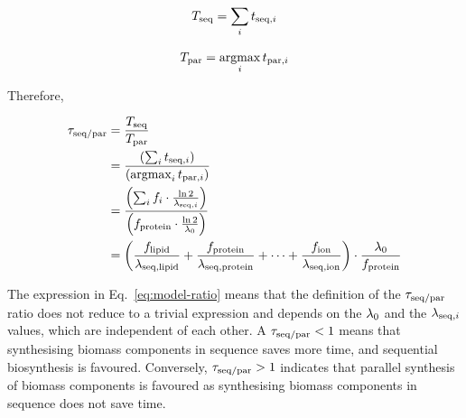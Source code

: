 \begin{equation}
  \Tseq = \sum_{i} \Tiabl %
  \label{eq:model-a}
\end{equation}


\begin{equation}
  T_{\mathrm{par}} = \operatorname*{argmax}_{i} t_{\mathrm{par},i}
  \label{eq:model-b}
\end{equation}


Therefore,

\begin{equation}
  \begin{aligned}
    \tau_{\mathrm{seq}/\mathrm{par}} &= \frac{T_{\mathrm{seq}}}{T_{\mathrm{par}}} \\
    & = \frac{\left( \sum_{i} t_{\mathrm{seq},i} \right)}{\left( \operatorname*{argmax}_{i} t_{\mathrm{par},i} \right)}\\
    & = \frac{\left(  \sum_{i} f_{i} \cdot \frac{\ln 2}{\lambda_{\mathrm{seq},i}} \right)}{\left( f_{\mathrm{protein}} \cdot \frac{\ln 2}{\lambda_{0}} \right)}\\
    & = \left( \frac{f_{\mathrm{lipid}}}{\lambda_{\mathrm{seq},\mathrm{lipid}}} + \frac{f_{\mathrm{protein}}}{\lambda_{\mathrm{seq},\mathrm{protein}}} + \cdots + \frac{f_{\mathrm{ion}}}{\lambda_{\mathrm{seq},\mathrm{ion}}} \right) \cdot \frac{\lambda_{0}}{f_{\mathrm{protein}}}
    \end{aligned}
  \label{eq:model-ratio}
\end{equation}

The expression in Eq.\ \ref{eq:model-ratio} means that the definition of the $\tau_{\mathrm{seq}/\mathrm{par}}$ ratio does not reduce to a trivial expression and depends on the $\lambda_{0}$ and the $\lambda_{\mathrm{seq},i}$ values, which are independent of each other.
A $\tau_{\mathrm{seq}/\mathrm{par}} < 1$ means that synthesising biomass components in sequence saves more time, and sequential biosynthesis is favoured.
Conversely, $\tau_{\mathrm{seq}/\mathrm{par}} > 1$ indicates that parallel synthesis of biomass components is favoured as synthesising biomass components in sequence does not save time.

